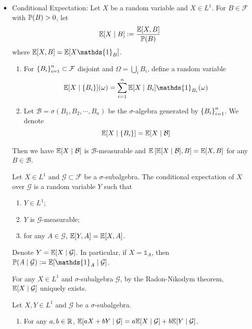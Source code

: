 \documentclass[a4paper,12pt]{article}
\begin{document}
\begin{itemize}
  \item Conditional Expectation: Let $X$ be a random variable and $X \in L^1$. For $B \in \mathcal{F}$ with $\mathbb{P}(B) > 0$, let
    \begin{equation*}
      \mathbb{E}[X \mid B] \vcentcolon= \frac{\mathbb{E}[X,B]}{\mathbb{P}(B)}
    \end{equation*}
    where $\E[X,B] = \E[X\mathds{1}_B]$.
  \begin{enumerate}[label=(\arabic*)]
    \item For $\left\{B_i\right\}_{i=1}^n \subset \mathcal{F}$ disjoint and $\Omega = \bigcup_iB_i$, define a random variable
    \begin{equation*}
      \E[X \mid \bb{B_i}](\omega) = \sum_{i=1}^n\E[X \mid B_i]\mathds{1}_{B_i}(\omega)
    \end{equation*}

    \item Let $\mathcal{B} = \sigma(B_1,B_2,\cdots,B_n)$ be the $\sigma$-algebra generated by $\left\{B_i\right\}_{i=1}^n$. We denote
    \begin{equation*}
      \mathbb{E}[X \mid \left\{B_i\right\}] = \mathbb{E}[X \mid \mathcal{B}]
    \end{equation*}
  \end{enumerate}
  Then we have $\mathbb{E}[X \mid \mathcal{B}]$ is $\mathcal{B}$-measurable and $\mathbb{E}\left[\mathbb{E}[X \mid \mathcal{B}], B\right] = \mathbb{E}[X, B]$ for any $B \in \mathcal{B}$.
  \begin{defn}
    Let $X \in L^1$ and $\mathcal{G} \subset \mathcal{F}$ be a $\sigma$-subalgebra. The conditional expectation of $X$ over $\mathcal{G}$ is a random variable $Y$ such that
    \begin{enumerate}[label=(\arabic*)]
      \item $Y \in L^1$;
      \item $Y$ is $\mathcal{G}$-measurable;
      \item for any $A \in \mathcal{G}$, $\mathbb{E}[Y, A] = \mathbb{E}[X, A]$.
    \end{enumerate}
    Denote $Y = \mathbb{E}[X\mid \mathcal{G}]$. In particular, if $X=\mathds{1}_A$, then $\Pb(A \mid \mathcal{G}) \defeq \E[\mathds{1}_A\mid \mathcal{G}]$.
  \end{defn}
  For any $X \in L^1$ and $\sigma$-subalgebra $\mathcal{G}$, by the Radon-Nikodym theorem, $\mathbb{E}[X\mid \mathcal{G}]$ uniquely exists.
  \begin{thm}
    Let $X,Y \in L^1$ and $\mathcal{G}$ be a $\sigma$-subalgebra.
    \begin{enumerate}[label=(\arabic*)]
      \item For any $a,b \in \mathbb{R}$, $\mathbb{E}[aX+bY\mid \mathcal{G}] = a\mathbb{E}[X\mid \mathcal{G}]+b\mathbb{E}[Y\mid \mathcal{G}]$.

\end{enumerate}
\end{thm}
\end{itemize}
\end{document}
